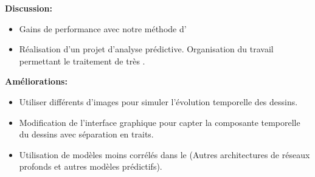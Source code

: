 \textbf{Discussion:}
\begin{itemize}
    \item Gains de performance avec notre méthode d'
    \item Réalisation  d'un projet d'analyse prédictive.
    Organisation du travail permettant le traitement de très .
\end{itemize}

\textbf{Améliorations:}
\begin{itemize}
    \item  Utiliser différents  d'images pour simuler l'évolution temporelle des dessins.
    \item Modification de l'interface graphique pour capter la composante temporelle du dessins avec séparation en traits.
    \item Utilisation de modèles moins corrélés dans le  (Autres architectures de réseaux profonds et autres modèles prédictifs).
\end{itemize}
\vspace{-3.5mm}